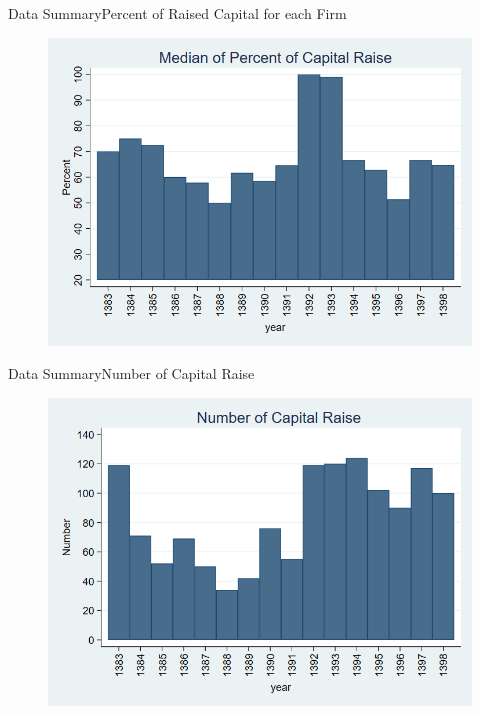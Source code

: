 \documentclass{beamer}
\begin{document}
\begin{frame}{Data Summary}{Percent of Raised Capital for each Firm}
\begin{figure}
\centering
\includegraphics[width=0.7\linewidth]{MedianPercent.png}
\label{fig:medianpercent}
\end{figure}
\end{frame}

\begin{frame}{Data Summary}{Number of Capital Raise}
\begin{figure}
\centering
\includegraphics[width=0.7\linewidth]{Number.png}
\label{fig:number}
\end{figure}
\end{frame}
\end{document}
